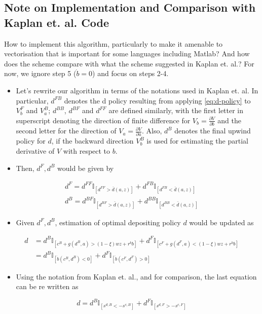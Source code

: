 \documentclass[11pt]{article}
\begin{document}
\subsection{Note on Implementation and Comparison with Kaplan et. al. Code}
\label{sec:org922707c}
How to implement this algorithm, particularly to make it amenable to vectorisation that is important for some languages including Matlab? And how does the scheme compare with what the scheme suggested in Kaplan et. al.? For now, we ignore step 5 (\(\dot{b} = 0\)) and focus on steps 2-4.

\begin{itemize}
\item Let's rewrite our algorithm in terms of the notations used in Kaplan et. al. In particular, \(d^{FB}\) denotes the d policy resulting from applying \eqref{eq:d-policy} to \(V_b^F\) and \(V_a^B\); \(d^{BB}\), \(d^{BF}\) and \(d^{FF}\) are defined similarly, with the first letter in superscript denoting the direction of finite difference for \(V_b = \frac{\partial V}{\partial b}\) and the second letter for the direction of \(V_a = \frac{\partial V}{\partial a}\). Also, \(d^B\) denotes the final upwind policy for \(d\), if the backward direction \(V_b^B\) is used for estimating the partial derivative of \(V\) with respect to \(b\).
\item Then, \(d^F, d^B\) would be given by
\end{itemize}
\begin{align*}
d^F = d^{FF} \mathbb{I}_{\left[d^{FF} > \bar{d}(a,z) \right]} + d^{FB} \mathbb{I}_{\left[d^{FB} < \bar{d}(a,z) \right]}\\
d^B = d^{BF} \mathbb{I}_{\left[d^{BF} > \bar{d}(a,z) \right]} + d^{BB} \mathbb{I}_{\left[d^{BB} < \bar{d}(a,z) \right]}
\end{align*}
\begin{itemize}
\item Given \(d^F, d^B\), estimation of optimal depositing policy \(d\) would be updated as
\end{itemize}
\begin{align*}
d &= d^B \mathbb{I}_{\left[ c^B + g(d^B,a) > (1-\xi) w z + r^bb \right]} + d^F \mathbb{I}_{\left[ c^F + g(d^F,a) < (1-\xi) w z + r^bb \right]} \\
&= d^B \mathbb{I}_{\left[ \dot{b} \left(c^B, d^B\right) < 0 \right]} + d^F \mathbb{I}_{\left[ \dot{b} \left(c^F, d^F\right) > 0 \right]}
\end{align*}
\begin{itemize}
\item Using the notation from Kaplan et. al., and for comparison, the last equation can be re written as
\end{itemize}
\[ d = d^B \mathbb{I}_{\left[s^{d,B}<-s^{c,B}  \right]} + d^F \mathbb{I}_{\left[ s^{d,F} > -s^{c,F} \right]}  \]
\end{document}
